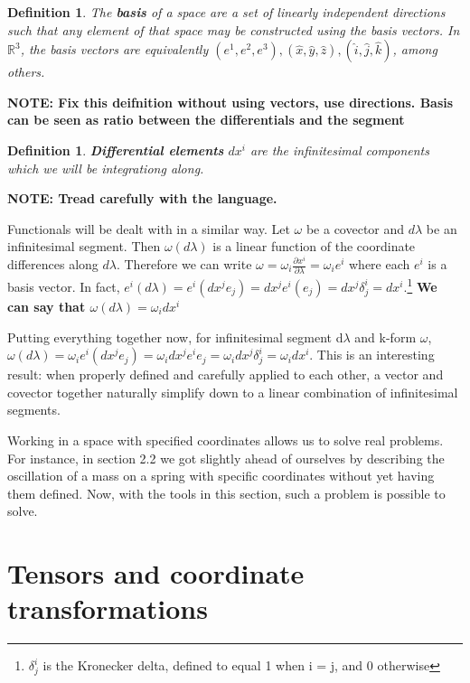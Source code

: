 \documentclass{book}
\newtheorem{defn}[equation]{Definition}
\begin{document}
\begin{defn}
	The \textbf{basis} of a space are a set of linearly independent directions such that any element of that space may be constructed using the basis vectors. In $\mathbb{R}^3$, the basis vectors are equivalently $(e^1, e^2, e^3), (\hat{x}, \hat{y}, \hat{z}), (\hat{i}, \hat{j}, \hat{k})$, among others. 
\end{defn}


\textbf{NOTE: Fix this deifnition without using vectors, use directions. Basis can be seen as ratio between the differentials and the segment}

\begin{defn}
	\textbf{Differential elements} $dx^i$ are the infinitesimal components which we will be integrationg along.  
\end{defn}

\textbf{NOTE: Tread carefully with the language. }

Functionals will be dealt with in a similar way. Let $\omega$ be a covector and $d\lambda$ be an infinitesimal segment. Then $\omega(d\lambda)$ is a linear function of the coordinate differences along $d\lambda$. Therefore we can write $\omega = \omega_i \frac{\partial x^i}{\partial \lambda} = \omega_i e^i$ where each $e^i$ is a basis vector. In fact, $e^i(d\lambda) = e^i(dx^j e_j) = dx^j e^i(e_j) = dx^j \delta^i_j = dx^i$.\footnote{$\delta^i_j$ is the Kronecker delta, defined to equal 1 when i = j, and 0 otherwise}
\textbf{We can say that $\omega(d\lambda) = \omega_i dx^i$}

Putting everything together now, for infinitesimal segment d$\lambda$ and k-form $\omega$, $\omega(d\lambda) = \omega_ie^i(dx^je_j) = \omega_idx^je^ie_j = \omega_idx^j\delta^i_j = \omega_i dx^i$. This is an interesting result: when properly defined and carefully applied to each other, a vector and covector together naturally simplify down to a linear combination of infinitesimal segments. 

Working in a space with specified coordinates allows us to solve real problems. For instance, in section 2.2 we got slightly ahead of ourselves by describing the oscillation of a mass on a spring with specific coordinates without yet having them defined. Now, with the tools in this section, such a problem is possible to solve.  



\section{Tensors and coordinate transformations}
\end{document}
